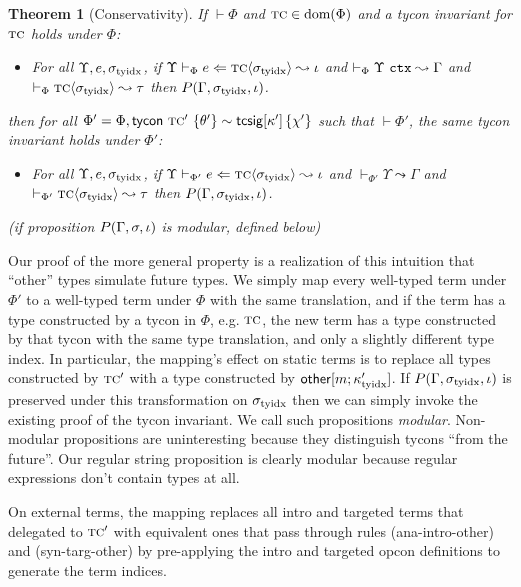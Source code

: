 \documentclass[preprint]{sigplanconf}
\newtheorem{theorem}{Theorem}
\newenvironment{proof-sketch}{\noindent{\emph{Proof Sketch.}}}{\qed}
\begin{document}
\begin{theorem}[Conservativity]\label{thm:conservativity} If $\vdash \Phi$ and $\textsc{tc} \in \text{dom}(\Phi)$ and a tycon invariant for $\textsc{tc}$ holds under $\Phi$: \begin{itemize}
\item For all $\Upsilon, e, \sigma_\text{tyidx}$, if $\Upsilon \vdash_{\Phi} e \Leftarrow {\textsc{tc}}\langle\sigma_\text{tyidx}\rangle \leadsto \iota$ and $\vdash_{\Phi} \Upsilon~\mathtt{ctx} \leadsto \Gamma$ and $\vdash_\Phi {{\textsc{tc}}\langle\sigma_\text{tyidx}\rangle} \leadsto \tau$  then $P(\Gamma, \sigma_\text{tyidx}, \iota)$.
\end{itemize} then for all $\Phi' = \Phi, {\sf tycon}~\textsc{tc}' ~\{\theta'\} \sim {\sf tcsig}[\kappa']\,\{\chi'\}$ such that $\vdash \Phi'$, the same tycon invariant holds under $\Phi'$: \begin{itemize}
\item For all $\Upsilon, e, \sigma_\text{tyidx}$, if $\Upsilon \vdash_{\Phi'} e \Leftarrow {\textsc{tc}}\langle\sigma_\text{tyidx}\rangle \leadsto \iota$ and $\vdash_{\Phi'} \Upsilon \leadsto \Gamma$ and $\vdash_{\Phi'}{{\textsc{tc}}\langle\sigma_\text{tyidx}\rangle}\leadsto{\tau}$ then $P(\Gamma, \sigma_\text{tyidx}, \iota)$.
\end{itemize}
(if proposition $P(\Gamma, \sigma, \iota)$ is \emph{modular}, defined below)
\end{theorem}
\begin{proof-sketch}
Our proof of the more general property is a realization of this intuition that ``other'' types simulate future types. We simply map every well-typed term under $\Phi'$ to a well-typed term under $\Phi$ with the same translation, and if the term has a type constructed by a tycon in $\Phi$, e.g. $\textsc{tc}$, the new term has a type constructed by that tycon with the same type translation, and only a slightly different type index. In particular, the mapping's effect on static terms is to replace all types constructed by $\textsc{tc}'$ with a type constructed by ${\sf other}[m;\kappa_\text{tyidx}']$. If $P(\Gamma, \sigma_\text{tyidx}, \iota)$ is preserved under this transformation on $\sigma_\text{tyidx}$ then we can simply invoke the existing proof of the tycon invariant. We call such propositions \emph{modular}. Non-modular propositions are uninteresting because they distinguish tycons ``from the future''. Our regular string proposition is clearly modular because regular expressions don't contain types at all.

On external terms, the mapping replaces all intro and targeted terms that delegated to $\textsc{tc}'$ with equivalent ones that pass through rules (ana-intro-other) and (syn-targ-other) by pre-applying the intro and targeted opcon definitions to generate the term indices.\end{proof-sketch}
\end{document}
